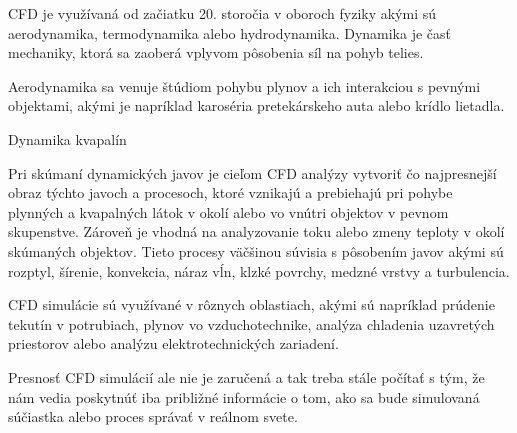 \documentclass[]{tukediphc}
\begin{document}
CFD je využívaná od začiatku 20. storočia v oboroch fyziky akými sú aerodynamika, termodynamika alebo hydrodynamika. Dynamika je časť mechaniky, ktorá sa zaoberá vplyvom pôsobenia síl na pohyb telies.

Aerodynamika sa venuje štúdiom pohybu plynov a ich interakciou s pevnými objektami, akými je napríklad karoséria pretekárskeho auta alebo krídlo lietadla. 

Dynamika kvapalín

Pri skúmaní dynamických javov je cieľom CFD analýzy vytvoriť čo najpresnejší obraz týchto javoch a procesoch, ktoré vznikajú a prebiehajú pri pohybe plynných a kvapalných látok v okolí alebo vo vnútri objektov v pevnom skupenstve. Zároveň je vhodná na analyzovanie toku alebo zmeny teploty v okolí skúmaných objektov. Tieto procesy väčšinou súvisia s pôsobením javov akými sú rozptyl, šírenie, konvekcia, náraz vĺn, klzké povrchy, medzné vrstvy a turbulencia.



CFD simulácie sú využívané v rôznych oblastiach, akými sú napríklad prúdenie tekutín v potrubiach, plynov vo vzduchotechnike, analýza chladenia uzavretých priestorov alebo analýzu elektrotechnických zariadení.

Presnosť CFD simulácií ale nie je zaručená a tak treba stále počítať s tým, že nám vedia poskytnúť iba približné informácie o tom, ako sa bude simulovaná súčiastka alebo proces správať v reálnom svete. 
\end{document}

